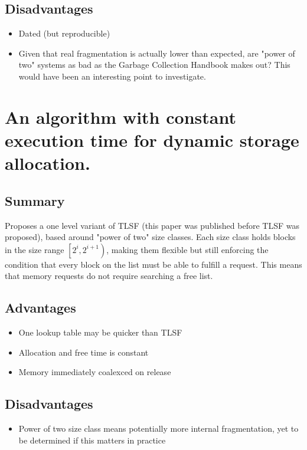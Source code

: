 \documentclass{report}
\begin{document}
\subsection{Disadvantages}
\begin{itemize}
	\item{Dated (but reproducible)}
	\item{Given that real fragmentation is actually lower than expected, are "power of two" systems as bad as the Garbage Collection Handbook makes out? This would have been an interesting point to investigate.}
\end{itemize}

\section[Constant Allocator]{An algorithm with constant execution time for dynamic storage allocation. \cite{528746}}
\subsection{Summary}
Proposes a one level variant of TLSF (this paper was published before TLSF was proposed), based around "power of two" size classes. Each size class holds blocks in the size range $\left[2^i, 2^{i + 1}\right)$, making them flexible but still enforcing the condition that every block on the list must be able to fulfill a request. This means that memory requests do not require searching a free list.
\subsection{Advantages}
\begin{itemize}
	\item{One lookup table may be quicker than TLSF}
	\item{Allocation and free time is constant}
	\item{Memory immediately coalexced on release}
\end{itemize}

\subsection{Disadvantages}
\begin{itemize}
	\item{Power of two size class means potentially more internal fragmentation, yet to be determined if this matters in practice}
\end{itemize}
\end{document}
